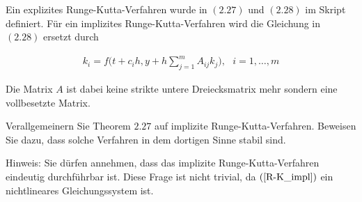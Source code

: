 \begin{exercise}
  Ein explizites Runge-Kutta-Verfahren wurde in $(2.27)$ und $(2.28)$ im Skript
  definiert. Für ein implizites Runge-Kutta-Verfahren wird die Gleichung in
  $(2.28)$ ersetzt durch

  \begin{align} \label{R-K_impl}
    k_i = f \Bigg( t + c_ih, y + h\sum_{j=1}^m A_{ij} k_j
    \Bigg),\text{ } i=1,\ldots, m
  \end{align}

  Die Matrix $A$ ist dabei keine strikte untere Dreiecksmatrix mehr sondern eine
  vollbesetzte Matrix.

  Verallgemeinern Sie Theorem $2.27$ auf implizite Runge-Kutta-Verfahren. Beweisen
  Sie dazu, dass solche Verfahren in dem dortigen Sinne stabil sind.

  Hinweis: Sie dürfen annehmen, dass das implizite Runge-Kutta-Verfahren eindeutig
  durchführbar ist. Diese Frage ist nicht trivial, da $(\ref{R-K_impl})$ ein
  nichtlineares Gleichungssystem ist.
\end{exercise}

